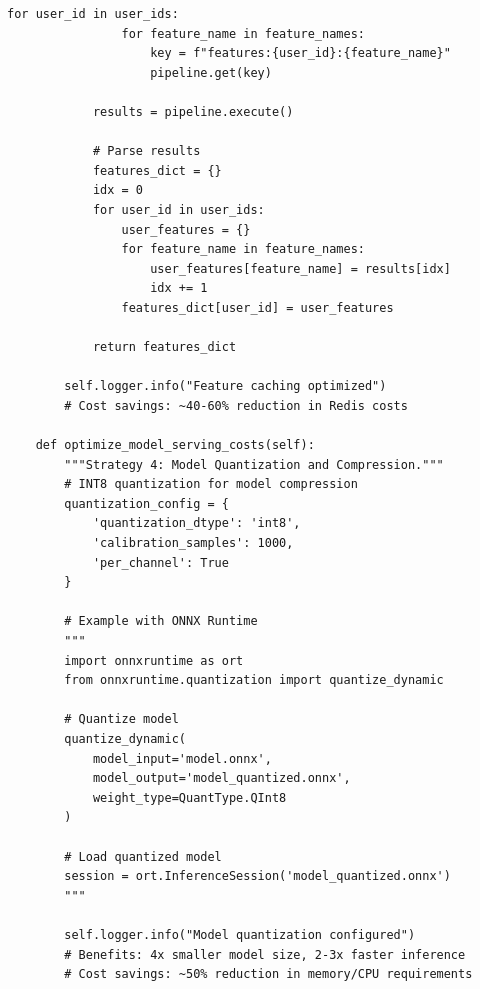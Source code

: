 \begin{lstlisting}[style=python, caption=Cost Optimization Implementation]
            for user_id in user_ids:
                for feature_name in feature_names:
                    key = f"features:{user_id}:{feature_name}"
                    pipeline.get(key)

            results = pipeline.execute()

            # Parse results
            features_dict = {}
            idx = 0
            for user_id in user_ids:
                user_features = {}
                for feature_name in feature_names:
                    user_features[feature_name] = results[idx]
                    idx += 1
                features_dict[user_id] = user_features

            return features_dict

        self.logger.info("Feature caching optimized")
        # Cost savings: ~40-60% reduction in Redis costs

    def optimize_model_serving_costs(self):
        """Strategy 4: Model Quantization and Compression."""
        # INT8 quantization for model compression
        quantization_config = {
            'quantization_dtype': 'int8',
            'calibration_samples': 1000,
            'per_channel': True
        }

        # Example with ONNX Runtime
        """
        import onnxruntime as ort
        from onnxruntime.quantization import quantize_dynamic

        # Quantize model
        quantize_dynamic(
            model_input='model.onnx',
            model_output='model_quantized.onnx',
            weight_type=QuantType.QInt8
        )

        # Load quantized model
        session = ort.InferenceSession('model_quantized.onnx')
        """

        self.logger.info("Model quantization configured")
        # Benefits: 4x smaller model size, 2-3x faster inference
        # Cost savings: ~50% reduction in memory/CPU requirements


\end{lstlisting}
